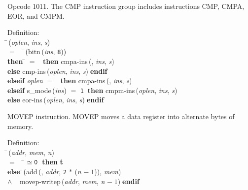  Opcode 1011.
 The CMP instruction group includes instructions CMP, CMPA, EOR, and CMPM.
\begin{tabbing}{\sc Definition}: \\  
\=\,({\it{oplen\/}}, {\it{ins\/}}, {\it{s\/}}) \\ 
$=$$\;\;\;\;$\=\,({\rm{bitn}}\,({\it{ins\/}}, {\tt{8}})) \\ 
{\bf then }\= $=$ {}$\;\;${\bf then }{\rm{cmpa-ins}}\,({}, {\it{ins\/}}, {\it{s\/}}) \\ 
{\bf else }{\rm{cmp-ins}}\,({\it{oplen\/}}, {\it{ins\/}}, {\it{s\/}})$\;${\bf  endif}\- \\ 
{\bf elseif }{\it{oplen\/}} $=$ {}$\;\;${\bf then }{\rm{cmpa-ins}}\,({}, {\it{ins\/}}, {\it{s\/}}) \\ 
{\bf elseif }{\rm{s\_mode}}\,({\it{ins\/}}) $=$ {\tt{1}}$\;\;${\bf then }{\rm{cmpm-ins}}\,({\it{oplen\/}}, {\it{ins\/}}, {\it{s\/}}) \\ 
{\bf else }{\rm{eor-ins}}\,({\it{oplen\/}}, {\it{ins\/}}, {\it{s\/}})$\;${\bf  endif}\-\-
\end{tabbing}

 MOVEP instruction.
 MOVEP moves a data register into alternate bytes of memory.
\begin{tabbing}{\sc Definition}: \\  
\=\,({\it{addr\/}}, {\it{mem\/}}, {\it{n\/}}) \\ 
$=$$\;\;\;\;$\= $\simeq {\tt{0}}$$\;\;${\bf then }{\bf{t}} \\ 
{\bf else }\=\,({\rm{add}}\,({}, {\it{addr\/}}, {\tt{2}} $*$ ({\it{n\/}} $-\;1$)), {\it{mem\/}}) \\ 
$\wedge$$\;\;\;\;${\rm{movep-writep}}\,({\it{addr\/}}, {\it{mem\/}}, {\it{n\/}} $-\;1$)\-$\;${\bf  endif}\-\-
\end{tabbing}

